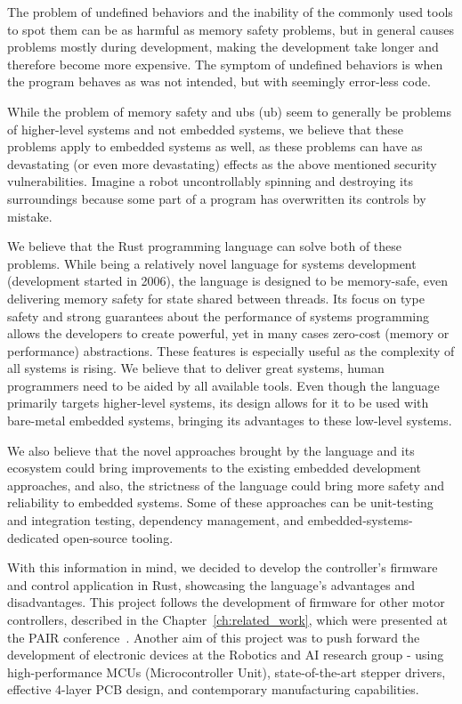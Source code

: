 The problem of undefined behaviors and the inability of the commonly used tools to spot them can be as harmful as memory safety problems, but in general causes problems mostly during development, making the development take longer and therefore become more expensive.
The symptom of undefined behaviors is when the program behaves as was not intended, but with seemingly error-less code.

While the problem of memory safety and \acs{ub}s (\acl{ub}) seem to generally be problems of higher-level systems and not embedded systems, we believe that these problems apply to embedded systems as well, as these problems can have as devastating (or even more devastating) effects as the above mentioned security vulnerabilities.
Imagine a robot uncontrollably spinning and destroying its surroundings because some part of a program has overwritten its controls by mistake.

We believe that the Rust programming language can solve both of these problems.
While being a relatively novel language for systems development (development started in 2006), the language is designed to be memory-safe, even delivering memory safety for state shared between threads.
Its focus on type safety and strong guarantees about the performance of systems programming allows the developers to create powerful, yet in many cases zero-cost (memory or performance) abstractions.
These features is especially useful as the complexity of all systems is rising.
We believe that to deliver great systems, human programmers need to be aided by all available tools.
Even though the language primarily targets higher-level systems, its design allows for it to be used with bare-metal embedded systems, bringing its advantages to these low-level systems.

We also believe that the novel approaches brought by the language and its ecosystem could bring improvements to the existing embedded development approaches, and also, the strictness of the language could bring more safety and reliability to embedded systems.
Some of these approaches can be unit-testing and integration testing, dependency management, and embedded-systems-dedicated open-source tooling.

With this information in mind, we decided to develop the controller's firmware and control application in Rust, showcasing the language's advantages and disadvantages.
This project follows the development of firmware for other motor controllers, described in the Chapter~\ref{ch:related_work}, which were presented at the PAIR conference~\cite{faigl_program_nodate}.
Another aim of this project was to push forward the development of electronic devices at the Robotics and AI research group - using high-performance MCUs (Microcontroller Unit), state-of-the-art stepper drivers, effective 4-layer PCB design, and contemporary manufacturing capabilities.
